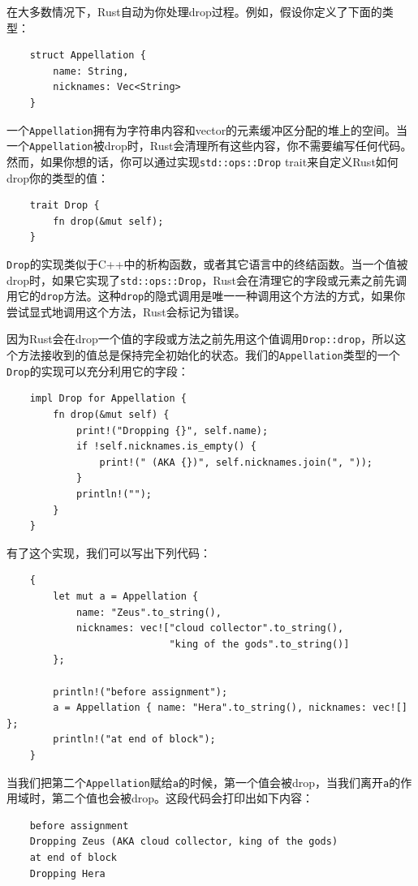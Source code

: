 在大多数情况下，Rust自动为你处理drop过程。例如，假设你定义了下面的类型：
\begin{verbatim}
    struct Appellation {
        name: String,
        nicknames: Vec<String>
    }
\end{verbatim}

一个\texttt{Appellation}拥有为字符串内容和vector的元素缓冲区分配的堆上的空间。当一个\texttt{Appellation}被drop时，Rust会清理所有这些内容，你不需要编写任何代码。然而，如果你想的话，你可以通过实现\texttt{std::ops::Drop} trait来自定义Rust如何drop你的类型的值：
\begin{verbatim}
    trait Drop {
        fn drop(&mut self);
    }
\end{verbatim}

\texttt{Drop}的实现类似于C++中的析构函数，或者其它语言中的终结函数。当一个值被drop时，如果它实现了\texttt{std::ops::Drop}，Rust会在清理它的字段或元素之前先调用它的\texttt{drop}方法。这种\texttt{drop}的隐式调用是唯一一种调用这个方法的方式，如果你尝试显式地调用这个方法，Rust会标记为错误。

因为Rust会在drop一个值的字段或方法之前先用这个值调用\texttt{Drop::drop}，所以这个方法接收到的值总是保持完全初始化的状态。我们的\texttt{Appellation}类型的一个\texttt{Drop}的实现可以充分利用它的字段：
\begin{verbatim}
    impl Drop for Appellation {
        fn drop(&mut self) {
            print!("Dropping {}", self.name);
            if !self.nicknames.is_empty() {
                print!(" (AKA {})", self.nicknames.join(", "));
            }
            println!("");
        }
    }
\end{verbatim}

有了这个实现，我们可以写出下列代码：
\begin{verbatim}
    {
        let mut a = Appellation {
            name: "Zeus".to_string(),
            nicknames: vec!["cloud collector".to_string(),
                            "king of the gods".to_string()]
        };

        println!("before assignment");
        a = Appellation { name: "Hera".to_string(), nicknames: vec![] };
        println!("at end of block");
    }
\end{verbatim}

当我们把第二个\texttt{Appellation}赋给\texttt{a}的时候，第一个值会被drop，当我们离开\texttt{a}的作用域时，第二个值也会被drop。这段代码会打印出如下内容：
\begin{verbatim}
    before assignment
    Dropping Zeus (AKA cloud collector, king of the gods)
    at end of block
    Dropping Hera
\end{verbatim}


